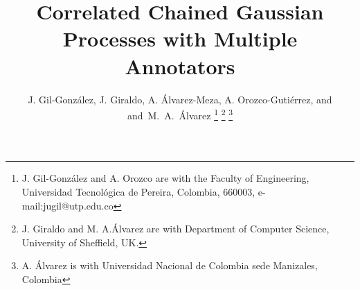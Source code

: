 \documentclass[journal]{IEEEtran}
\begin{document}
%
\title{Correlated Chained Gaussian Processes with Multiple Annotators}
%
%
%

\author{J. Gil-Gonz\'alez,
        J. Giraldo,
        A. \'Alvarez-Meza, A. Orozco-Guti\'errez, and
        and~M.~A.~\'Alvarez%
\thanks{J. Gil-Gonz\'alez and A. Orozco are with the Faculty of Engineering, Universidad Tecnol\'ogica de Pereira, Colombia, 660003, e-mail:jugil@utp.edu.co}%
\thanks{J. Giraldo and M. A.\'Alvarez are with Department of Computer Science, University of Sheffield, UK.}%
\thanks{A. \'Alvarez is with  Universidad Nacional de Colombia sede Manizales, Colombia}}

% 
%
\end{document}
